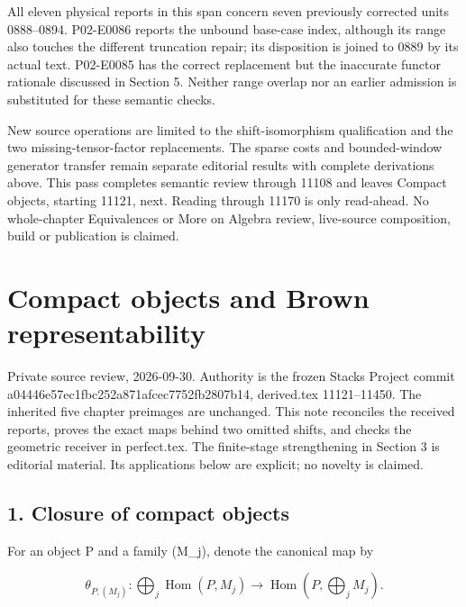 \documentclass[11pt]{article}
\begin{document}
All eleven physical reports in this span concern seven previously corrected units 0888–\allowbreak{}0894. P02-E0086 reports the unbound base-case index,\allowbreak{} although its range also touches the different truncation repair; its disposition is joined to 0889 by its actual text. P02-E0085 has the correct replacement but the inaccurate functor rationale discussed in Section 5. Neither range overlap nor an earlier admission is substituted for these semantic checks.

New source operations are limited to the shift-isomorphism qualification and the two missing-tensor-factor replacements. The sparse costs and bounded-window generator transfer remain separate editorial results with complete derivations above. This pass completes semantic review through 11108 and leaves Compact objects,\allowbreak{} starting 11121,\allowbreak{} next. Reading through 11170 is only read-ahead. No whole-chapter Equivalences or More on Algebra review,\allowbreak{} live-source composition,\allowbreak{} build or publication is claimed.
\clearpage
\section{Compact objects and Brown representability}\label{proofs-11121-11450-compact-objects-and-brown-representability}

Private source review,\allowbreak{} 2026-09-30. Authority is the frozen Stacks Project commit a04446e5\allowbreak{}7ec1fbc2\allowbreak{}52a871af\allowbreak{}cec7752f\allowbreak{}b2807b14, derived.tex 11121–\allowbreak{}11450. The inherited five chapter preimages are unchanged. This note reconciles the received reports,\allowbreak{} proves the exact maps behind two omitted shifts,\allowbreak{} and checks the geometric receiver in perfect.tex. The finite-stage strengthening in Section 3 is editorial material. Its applications below are explicit; no novelty is claimed.

\subsection{1. Closure of compact objects}\label{proofs-11121-11450-closure-of-compact-objects}

For an object P and a family (M\_\allowbreak{}j)\allowbreak{},\allowbreak{} denote the canonical map by

\[
 \theta_{P,(M_j)}:\bigoplus_j\operatorname{Hom}(P,M_j)
       \longrightarrow\operatorname{Hom}(P,\bigoplus_jM_j).
\]
\end{document}

